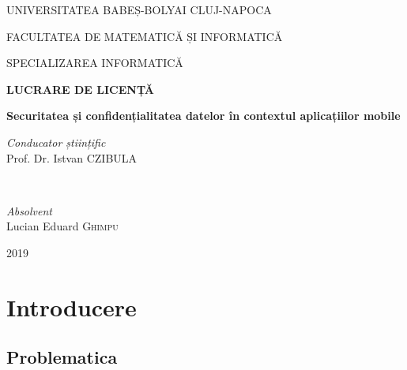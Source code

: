 \documentclass[12pt]{article}
\begin{document}
\begin{titlepage}
    \begin{center}
        {\scshape\large UNIVERSITATEA BABEȘ-BOLYAI CLUJ-NAPOCA \par}
        \vspace{0.2cm}
        {\scshape\large FACULTATEA DE MATEMATICĂ ȘI INFORMATICĂ \par}
        \vspace{0.2cm}
        {\scshape\large SPECIALIZAREA INFORMATICĂ \par}
        \vspace{4.5cm}
        {\LARGE\bfseries LUCRARE DE LICENȚĂ \par}
        \vspace{0.3cm}
        {\LARGE\bfseries Securitatea și confidențialitatea datelor în contextul aplicațiilor mobile\par}
        \vspace{0.5cm}
   \end{center}

\vspace*{\fill}
\begin{minipage}{0.5\textwidth}
\begin{flushleft} \large
\emph{Conducator științific}\\
Prof. Dr. Istvan \textsc{CZIBULA} 
\end{flushleft}
\end{minipage}
~
\begin{minipage}{0.4\textwidth}
\begin{flushright} \large
\emph{Absolvent}\\
Lucian Eduard \textsc{Ghimpu} 
\end{flushright}
\end{minipage}
\vspace{2.0cm}
\begin{center}
{\large 2019}
\end{center}
\end{titlepage}


\tableofcontents

\newpage
\section{Introducere}
\subsection{Problematica}
\end{document}
